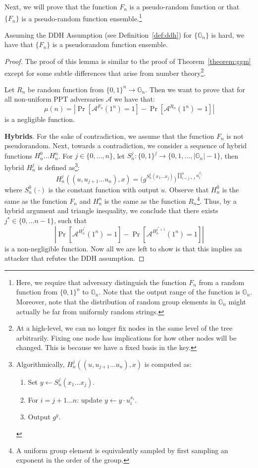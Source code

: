 \documentclass[12pt]{tufte-book}
\begin{document}
Next, we will prove that the function $F_n$ is a pseudo-random function or that $\{F_n\}$ is a pseudo-random function ensemble.\footnote{Here, we require that adversary distinguish the function $F_n$ from a random function from $\{0,1\}^n$ to $\mathbb{G}_n$. Note that the output range of the function is $\mathbb{G}_n$. Moreover, note that the distribution of random group elements in $\mathbb{G}_n$ might actually be far from uniformly random strings.}
\begin{lemma}
    Assuming the DDH Assumption (see Definition~\ref{def:ddh}) for $\{\mathbb{G}_n\}$ is hard, we have that $\{F_n\}$ is a pseudorandom function ensemble.
\end{lemma}
\begin{proof}
    The proof of this lemma is similar to the proof of Theorem~\ref{theorem:ggm} except for some subtle differences that arise from number theory\footnote{At a high-level, we can no longer fix nodes in the same level of the tree arbitrarily. Fixing one node has implications for how other nodes will be changed. This is because we have a fixed basis in the key.}.

    Let $R_n$ be random function from $\{0,1\}^n \rightarrow \mathbb{G}_n$. Then we want to prove that for all non-uniform PPT adversaries $\mathcal{A}$ we have that:
    \[\mu(n) = \left|\Pr[\mathcal{A}^{F_n}(1^n) =1] -  \Pr[\mathcal{A}^{R_n}(1^n) =1]\right|\]
    is a negligible function. \smallskip

    \noindent \textbf{Hybrids}. For the sake of contradiction, we assume that the function $F_n$ is not pseudorandom. Next, towards a contradiction, we consider a sequence of hybrid functions $H^0_n \ldots H^n_n$.
    For $j \in \{0, \dots, n\}$, let $S^j_n: \{0, 1\}^j \to \{0, 1, \dots, |\mathbb{G}_n|-1\}$, then hybrid $H_n^j$ is defined as\footnote{Algorithmically, $H_n^j((u,u_{j+1}\ldots u_n),x)$ is computed as:
    \begin{enumerate}
        \item Set $y \gets S_n^j(x_1\ldots x_j)$.
        \item For $i = j+1 \dots n$: update $y \gets y \cdot u_i^{x_i}$.
        \item Output $g^y$.
    \end{enumerate}

    }:
    \begin{equation*}
        H_n^j((u,u_{j+1}\ldots u_n),x) = \big(g^{S_n^j(x_1\ldots x_j)}\big)^{\prod_{i=j+1}^n u_i^{x_i}}
    \end{equation*}
    where $S_n^0(\cdot)$ is the constant function with output $u$. Observe that $H_n^0$ is the same as the function $F_n$ and $H_n^n$ is the same as the function $R_n$\footnote{A uniform group element is equivalently sampled by first sampling an exponent in the order of the group.}. Thus, by a hybrid argument and triangle inequality, we conclude that there exists $j^* \in \{0,\ldots n-1\}$, such that
    \[\left|\Pr[\mathcal{A}^{H_n^{j^*}}(1^n) =1] -  \Pr[\mathcal{A}^{H_n^{j^*+1}}(1^n) =1]\right|\]
    is a non-negligible function. Now all we are left to show is that this implies an attacker that refutes the DDH assumption.\smallskip


\end{proof}
\end{document}
